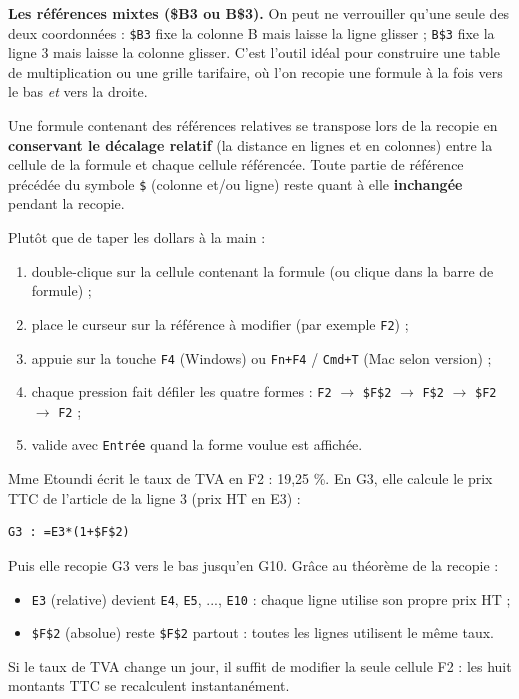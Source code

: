 \documentclass[11pt]{article}
\begin{document}
\textbf{Les références mixtes (\$B3 ou B\$3).} On peut ne verrouiller qu'une seule des deux coordonnées : \texttt{\$B3} fixe la colonne B mais laisse la ligne glisser ; \texttt{B\$3} fixe la ligne 3 mais laisse la colonne glisser. C'est l'outil idéal pour construire une table de multiplication ou une grille tarifaire, où l'on recopie une formule à la fois vers le bas \emph{et} vers la droite.

\begin{propriete}
Une formule contenant des références relatives se transpose lors de la recopie en \textbf{conservant le décalage relatif} (la distance en lignes et en colonnes) entre la cellule de la formule et chaque cellule référencée. Toute partie de référence précédée du symbole \texttt{\$} (colonne et/ou ligne) reste quant à elle \textbf{inchangée} pendant la recopie.
\end{propriete}

\begin{methode}
Plutôt que de taper les dollars à la main :
\begin{enumerate}
\item double-clique sur la cellule contenant la formule (ou clique dans la barre de formule) ;
\item place le curseur sur la référence à modifier (par exemple \texttt{F2}) ;
\item appuie sur la touche \texttt{F4} (Windows) ou \texttt{Fn+F4} / \texttt{Cmd+T} (Mac selon version) ;
\item chaque pression fait défiler les quatre formes : \texttt{F2} $\rightarrow$ \texttt{\$F\$2} $\rightarrow$ \texttt{F\$2} $\rightarrow$ \texttt{\$F2} $\rightarrow$ \texttt{F2} ;
\item valide avec \texttt{Entrée} quand la forme voulue est affichée.
\end{enumerate}
\end{methode}

\begin{exemplebox}
Mme Etoundi écrit le taux de TVA en F2 : 19,25 \%. En G3, elle calcule le prix TTC de l'article de la ligne 3 (prix HT en E3) :
\begin{lstlisting}
G3 : =E3*(1+$F$2)
\end{lstlisting}
Puis elle recopie G3 vers le bas jusqu'en G10. Grâce au théorème de la recopie :
\begin{itemize}
\item \texttt{E3} (relative) devient \texttt{E4}, \texttt{E5}, ..., \texttt{E10} : chaque ligne utilise son propre prix HT ;
\item \texttt{\$F\$2} (absolue) reste \texttt{\$F\$2} partout : toutes les lignes utilisent le même taux.
\end{itemize}
Si le taux de TVA change un jour, il suffit de modifier la seule cellule F2 : les huit montants TTC se recalculent instantanément.
\end{exemplebox}
\end{document}
